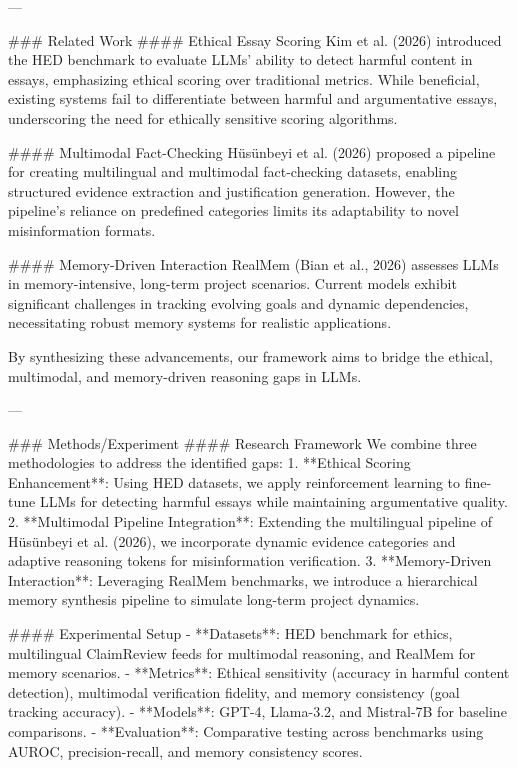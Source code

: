 ---

### Related Work  
#### Ethical Essay Scoring  
Kim et al. (2026) introduced the HED benchmark to evaluate LLMs' ability to detect harmful content in essays, emphasizing ethical scoring over traditional metrics. While beneficial, existing systems fail to differentiate between harmful and argumentative essays, underscoring the need for ethically sensitive scoring algorithms.

#### Multimodal Fact-Checking  
Hüsünbeyi et al. (2026) proposed a pipeline for creating multilingual and multimodal fact-checking datasets, enabling structured evidence extraction and justification generation. However, the pipeline's reliance on predefined categories limits its adaptability to novel misinformation formats.

#### Memory-Driven Interaction  
RealMem (Bian et al., 2026) assesses LLMs in memory-intensive, long-term project scenarios. Current models exhibit significant challenges in tracking evolving goals and dynamic dependencies, necessitating robust memory systems for realistic applications.

By synthesizing these advancements, our framework aims to bridge the ethical, multimodal, and memory-driven reasoning gaps in LLMs.

---

### Methods/Experiment  
#### Research Framework  
We combine three methodologies to address the identified gaps:  
1. **Ethical Scoring Enhancement**: Using HED datasets, we apply reinforcement learning to fine-tune LLMs for detecting harmful essays while maintaining argumentative quality.  
2. **Multimodal Pipeline Integration**: Extending the multilingual pipeline of Hüsünbeyi et al. (2026), we incorporate dynamic evidence categories and adaptive reasoning tokens for misinformation verification.  
3. **Memory-Driven Interaction**: Leveraging RealMem benchmarks, we introduce a hierarchical memory synthesis pipeline to simulate long-term project dynamics.

#### Experimental Setup  
- **Datasets**: HED benchmark for ethics, multilingual ClaimReview feeds for multimodal reasoning, and RealMem for memory scenarios.  
- **Metrics**: Ethical sensitivity (accuracy in harmful content detection), multimodal verification fidelity, and memory consistency (goal tracking accuracy).  
- **Models**: GPT-4, Llama-3.2, and Mistral-7B for baseline comparisons.  
- **Evaluation**: Comparative testing across benchmarks using AUROC, precision-recall, and memory consistency scores.  

